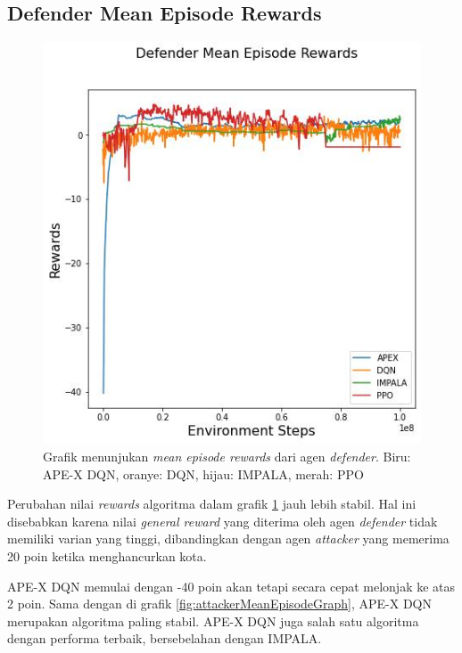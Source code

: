 \subsection{Defender Mean Episode Rewards}

\begin{figure}[H]
  \centering
    \includegraphics[scale=0.52]{gambar/defender_reward_mean.jpg}
    \caption{Grafik menunjukan \emph{mean episode rewards} dari agen \emph{defender}.
    Biru: APE-X DQN, oranye: DQN, hijau: IMPALA, merah: PPO}
    \label{fig:defenderMeanEpisodeGraph}
\end{figure}

Perubahan nilai \emph{rewards} algoritma dalam grafik \ref{fig:defenderMeanEpisodeGraph} jauh lebih stabil.
Hal ini disebabkan karena nilai \emph{general reward} yang diterima oleh agen \emph{defender} tidak memiliki varian yang tinggi,
dibandingkan dengan agen \emph{attacker} yang memerima 20 poin ketika menghancurkan kota.

APE-X DQN memulai dengan -40 poin akan tetapi secara cepat melonjak ke atas 2 poin.
Sama dengan di grafik \ref{fig:attackerMeanEpisodeGraph}, APE-X DQN merupakan algoritma paling stabil.
APE-X DQN juga salah satu algoritma dengan performa terbaik, bersebelahan dengan IMPALA.

